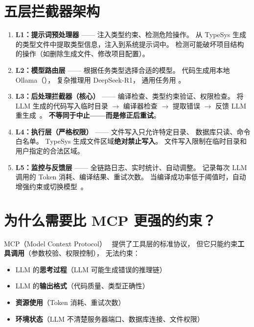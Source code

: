 \documentclass[10pt, openany]{book}
\begin{document}
\section{五层拦截器架构}

\begin{enumerate}
    \item \textbf{L1：提示词预处理器} —— 注入类型约束、检测危险操作。
        从 TypeSys 生成的类型文件中提取类型信息，注入到系统提示词中。
        检测可能破坏项目结构的操作（如删除生成文件、修改项目配置）。
    
    \item \textbf{L2：模型路由层} —— 根据任务类型选择合适的模型。
        代码生成用本地 Ollama（），
        复杂推理用 DeepSeek-R1，
        通用任务用 。
    
    \item \textbf{L3：后处理拦截器（核心）} —— 编译检查、类型约束验证、权限检查。
        将 LLM 生成的代码写入临时目录 \(\rightarrow\) 编译器检查 \(\rightarrow\)
        提取错误 \(\rightarrow\) 反馈 LLM 重生成~\cite{Shinn2024Reflexion,Wang2023SelfRefine}。
        \textbf{不等同于中止——而是修正后重试}。
    
    \item \textbf{L4：执行层（严格权限）} —— 文件写入只允许特定目录、
        数据库只读、命令白名单。
        TypeSys 生成文件区域\textbf{绝对禁止写入}。
        文件写入限制在临时目录和用户指定的合法区域。
    
    \item \textbf{L5：监控与反馈层} —— 全链路日志、实时统计、自动调整。
        记录每次 LLM 调用的 Token 消耗、编译结果、重试次数。
        当编译成功率低于阈值时，自动增强约束或切换模型~\cite{Wu2024AutoGen}。
\end{enumerate}

\section{为什么需要比 MCP 更强的约束？}

MCP（Model Context Protocol）~\cite{Anthropic2024MCP} 提供了工具层的标准协议，
但它只能约束\textbf{工具调用}（参数校验、权限控制），
无法约束：
\begin{itemize}
    \item LLM 的\textbf{思考过程}（LLM 可能生成错误的推理链）
    \item LLM 的\textbf{输出格式}（代码质量、类型正确性）
    \item \textbf{资源使用}（Token 消耗、重试次数）
    \item \textbf{环境状态}（LLM 不清楚服务器端口、数据库连接、文件权限）
\end{itemize}
\end{document}
